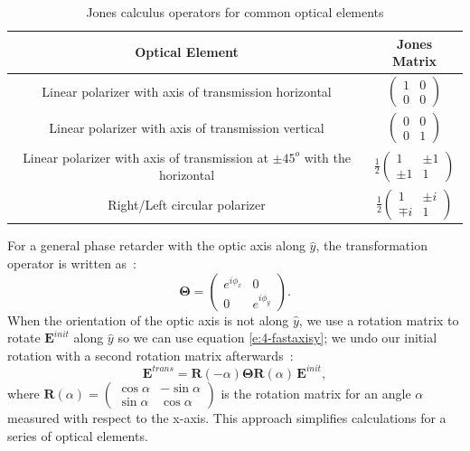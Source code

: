 \begin{table}
\caption{Jones calculus operators for common optical elements}
\begin{tabular}{|c|c|}
\hline
{\bf Optical Element} & {\bf Jones Matrix} \\ \hline \hline
Linear polarizer with axis of transmission horizontal & $\begin{pmatrix}1 & 0 \\ 0 & 0 \end{pmatrix}$ \\ \hline
Linear polarizer with axis of transmission vertical &$\begin{pmatrix}0 & 0 \\ 0 & 1 \end{pmatrix}$ \\ \hline
Linear polarizer with axis of transmission at $\pm 45^o$ with the horizontal &$\frac{1}{2} \begin{pmatrix}1 & \pm 1 \\ \pm 1 & 1\end{pmatrix}$ \\ \hline
Right/Left circular polarizer & $\frac{1}{2} \begin{pmatrix}
1 & \pm i \\ \mp i & 1
\end{pmatrix}$ \\
\hline
\end{tabular}\label{t:4-jmats}
\end{table}

For a general phase retarder with the optic axis along $\hat{y}$, the transformation operator is written as~\cite{RN232}:
\begin{equation}\label{e:4-fastaxisy}
\bm{\Theta} = \begin{pmatrix}e^{i \phi_x} & 0 \\ 0 & e^{i \phi_y} \end{pmatrix}.
\end{equation}
When the orientation of the optic axis is not along $\hat{y}$, we use a rotation matrix to rotate $\mathbf{E}^{init}$ along $\hat{y}$ so we can use equation \ref{e:4-fastaxisy}; we undo our initial rotation with a second rotation matrix afterwards~:
\begin{equation} \label{e:4-jones_decouple}
\mathbf{E}^{trans} = \mathbf{R}(-\alpha)\bm{\Theta} \mathbf{R}(\alpha)\,\mathbf{E}^{init},
\end{equation}
where $\mathbf{R}(\alpha) = \begin{pmatrix} \cos \alpha & -\sin \alpha \\ \sin \alpha & \cos \alpha \end{pmatrix}$
is the rotation matrix for an angle $\alpha$ measured with respect to the x-axis.
This approach simplifies calculations for a series of optical elements.

